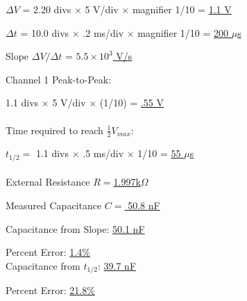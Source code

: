 \documentclass[twocolumn,english]{IEEEtran}
\theoremstyle{plain}
\theoremstyle{plain}
\begin{document}
$\Delta V$ = 2.20 divs $\times$ 5 V/div $\times$ magnifier 1/10 = \hfill\underline{1.1 V}

$\Delta t$ = 10.0 divs $\times$ .2 ms/div $\times$ magnifier 1/10 = \hfill\underline{200 $\mu$s}

Slope $\Delta V / \Delta t$ = \hfill \underline{$5.5 \times 10^3$ V/s}

\hrulefill

Channel 1 Peak-to-Peak:

1.1 divs $\times$ 5 V/div $\times$ (1/10) = \hfill\underline{.55 V} \\ \\

Time required to reach $\frac{1}{2}V_{max}$:

$t_{1/2} = $ 1.1 divs $\times$ .5 ms/div $\times$ 1/10 = \hfill\underline{55 $\mu$s} \\ \\

External Resistance \hfill\underline{$R = $1.997k$\Omega$}

Measured Capacitance \hfill\underline{$C = $ 50.8 nF}

\hrulefill

Capacitance from Slope: \hfill\underline{50.1 nF}

Percent Error: \hfill\underline{1.4\%} \\

Capacitance from $t_{1/2}$: \hfill\underline{39.7 nF}

Percent Error: \hfill\underline{21.8\%}

\hrulefill


\appendices{}

%
%
\end{document}
